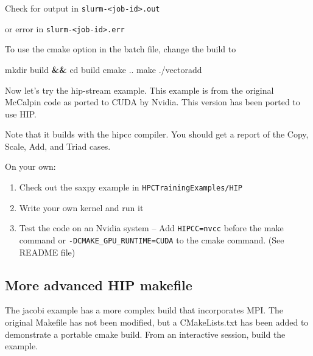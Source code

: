 \documentclass[
]{article}
\providecommand{\tightlist}{%
  \setlength{\itemsep}{0pt}\setlength{\parskip}{0pt}}
\let\oldtexttt\texttt
\renewcommand{\texttt}[1]{
  \colorbox{Light}{\oldtexttt{#1}}
}
\newenvironment{Shaded}{}{}
\newcommand{\BuiltInTok}[1]{#1}
\newcommand{\ExtensionTok}[1]{#1}
\newcommand{\FunctionTok}[1]{\textcolor[rgb]{0.02,0.16,0.49}{#1}}
\newcommand{\KeywordTok}[1]{\textcolor[rgb]{0.00,0.44,0.13}{\textbf{#1}}}
\newcommand{\NormalTok}[1]{#1}
\newcommand{\VariableTok}[1]{\textcolor[rgb]{0.10,0.09,0.49}{#1}}
\providecommand{\tightlist}{%
  \setlength{\itemsep}{0pt}\setlength{\parskip}{0pt}}
\begin{document}
Check for output in \texttt{slurm-\textless{}job-id\textgreater{}.out}
or error in \texttt{slurm-\textless{}job-id\textgreater{}.err}

To use the cmake option in the batch file, change the build to

\begin{Shaded}
\begin{Highlighting}[]
\FunctionTok{mkdir}\NormalTok{ build }\KeywordTok{\&\&} \BuiltInTok{cd}\NormalTok{ build}
\FunctionTok{cmake}\NormalTok{ ..}
\FunctionTok{make}
\ExtensionTok{./vectoradd}
\end{Highlighting}
\end{Shaded}

Now let's try the hip-stream example. This example is from the original
McCalpin code as ported to CUDA by Nvidia. This version has been ported
to use HIP.

\begin{Shaded}
\end{Shaded}

Note that it builds with the hipcc compiler. You should get a report of
the Copy, Scale, Add, and Triad cases.

On your own:

\begin{enumerate}
\def\labelenumi{\arabic{enumi}.}
\tightlist
\item
  Check out the saxpy example in \texttt{HPCTrainingExamples/HIP}
\item
  Write your own kernel and run it
\item
  Test the code on an Nvidia system -- Add \texttt{HIPCC=nvcc} before
  the make command or \texttt{-DCMAKE\_GPU\_RUNTIME=CUDA} to the cmake
  command. (See README file)
\end{enumerate}

\hypertarget{more-advanced-hip-makefile}{%
\subsection{More advanced HIP
makefile}\label{more-advanced-hip-makefile}}

The jacobi example has a more complex build that incorporates MPI. The
original Makefile has not been modified, but a CMakeLists.txt has been
added to demonstrate a portable cmake build. From an interactive
session, build the example.
\end{document}
